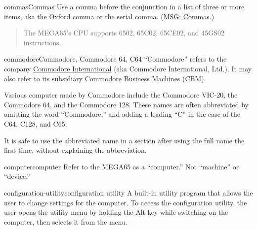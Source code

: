\begin{sgentry}{commas}{Commas}
    Use a comma before the conjunction in a list of three or more items, aka the Oxford comma or the serial comma. (\href{https://learn.microsoft.com/en-us/style-guide/punctuation/commas}{MSG: Commas}.)

    \begin{quote}
        The MEGA65's CPU supports 6502, 65C02, 65CE02, and 45GS02 instructions.
    \end{quote}
\end{sgentry}

\begin{sgentry}{commodore}{Commodore, Commodore 64, C64}
    ``Commodore'' refers to the company \href{https://en.wikipedia.org/wiki/Commodore_International}{Commodore International} (aka Commodore International, Ltd.). It may also refer to its subsidiary Commodore Business Machines (CBM).

    Various computer made by Commodore include the Commodore VIC-20, the Commodore 64, and the Commodore 128. These names are often abbreviated by omitting the word ``Commodore,'' and adding a leading ``C'' in the case of the C64, C128, and C65.

    It is safe to use the abbreviated name in a section after using the full name the first time, without explaining the abbreviation.
\end{sgentry}

\begin{sgentry}{computer}{computer}
    Refer to the MEGA65 as a ``computer.'' Not ``machine'' or ``device.''
\end{sgentry}

\begin{sgentry}{configuration-utility}{configuration utility}
    A built-in utility program that allows the user to change settings for the computer. To access the configuration utility, the user opens the utility menu by holding the Alt key while switching on the computer, then selects it from the menu.
\end{sgentry}


